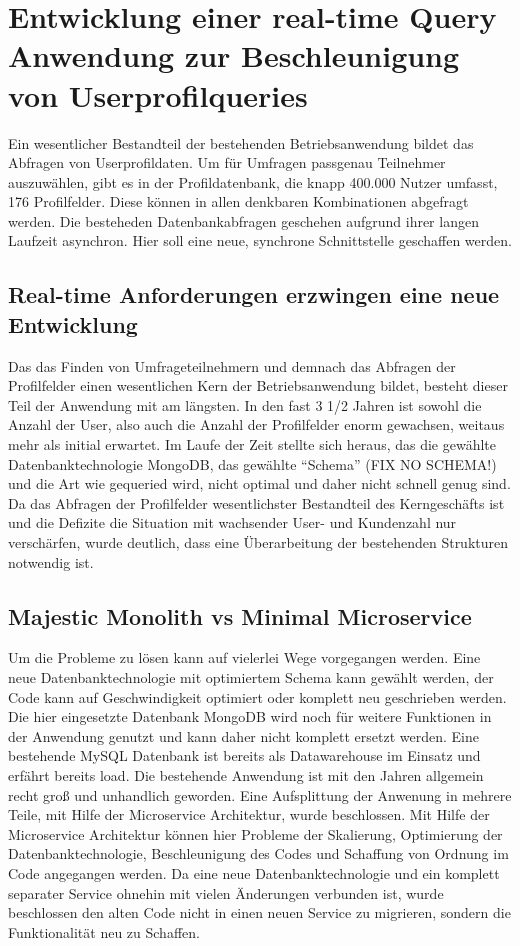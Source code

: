 \chapter{Entwicklung einer real-time Query Anwendung zur Beschleunigung von Userprofilqueries}
Ein wesentlicher Bestandteil der bestehenden Betriebsanwendung bildet das Abfragen von Userprofildaten. Um für Umfragen passgenau Teilnehmer auszuwählen, gibt es in der Profildatenbank, die knapp 400.000 Nutzer umfasst, 176 Profilfelder. Diese können in allen denkbaren Kombinationen abgefragt werden. Die besteheden Datenbankabfragen geschehen aufgrund ihrer langen Laufzeit asynchron. Hier soll eine neue, synchrone Schnittstelle geschaffen werden.

\section{Real-time Anforderungen erzwingen eine neue Entwicklung}
Das das Finden von Umfrageteilnehmern und demnach das Abfragen der Profilfelder einen wesentlichen Kern der Betriebsanwendung bildet, besteht dieser Teil der Anwendung mit am längsten. In den fast 3 1/2 Jahren ist sowohl die Anzahl der User, also auch die Anzahl der Profilfelder enorm gewachsen, weitaus mehr als initial erwartet. Im Laufe der Zeit stellte sich heraus, das die gewählte Datenbanktechnologie MongoDB, das gewählte ``Schema'' (FIX NO SCHEMA!) und die Art wie gequeried wird, nicht optimal und daher nicht schnell genug sind. Da das Abfragen der Profilfelder wesentlichster Bestandteil des Kerngeschäfts ist und die Defizite die Situation mit wachsender User- und Kundenzahl nur verschärfen, wurde deutlich, dass eine Überarbeitung der bestehenden Strukturen notwendig ist.

\section{Majestic Monolith vs Minimal Microservice}
Um die Probleme zu lösen kann auf vielerlei Wege vorgegangen werden. Eine neue Datenbanktechnologie mit optimiertem Schema kann gewählt werden, der Code kann auf Geschwindigkeit optimiert oder komplett neu geschrieben werden.
Die hier eingesetzte Datenbank MongoDB wird noch für weitere Funktionen in der Anwendung genutzt und kann daher nicht komplett ersetzt werden. Eine bestehende MySQL Datenbank ist bereits als Datawarehouse im Einsatz und erfährt bereits load.
Die bestehende Anwendung ist mit den Jahren allgemein recht groß und unhandlich geworden.
Eine Aufsplittung der Anwenung in mehrere Teile, mit Hilfe der Microservice Architektur, wurde beschlossen.
Mit Hilfe der Microservice Architektur können hier Probleme der Skalierung, Optimierung der Datenbanktechnologie, Beschleunigung des Codes und Schaffung von Ordnung im Code angegangen werden.
Da eine neue Datenbanktechnologie und ein komplett separater Service ohnehin mit vielen Änderungen verbunden ist, wurde beschlossen den alten Code nicht in einen neuen Service zu migrieren, sondern die Funktionalität neu zu Schaffen.

